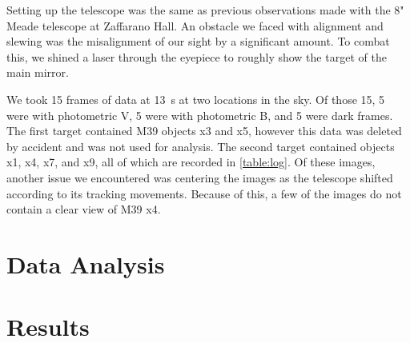 \documentclass[%
aip,
jmp,
reprint,
floatfix
]{revtex4-1}
\begin{document}
	Setting up the telescope was the same as previous observations made with the 8" Meade telescope at Zaffarano Hall. An obstacle we faced with alignment and slewing was the misalignment of our sight by a significant amount. To combat this, we shined a laser through the eyepiece to roughly show the target of the main mirror.
	
	We took 15 frames of data at \SI{13}{\second} at two locations in the sky. Of those 15, 5 were with photometric V, 5 were with photometric B, and 5 were dark frames. The first target contained M39 objects x3 and x5, however this data was deleted by accident and was not used for analysis. The second target contained objects x1, x4, x7, and x9, all of which are recorded in \autoref{table:log}. Of these images, another issue we encountered was centering the images as the telescope shifted according to its tracking movements. Because of this, a few of the images do not contain a clear view of M39 x4. 


	\section{Data Analysis}




	\section{Results}


\end{document}
